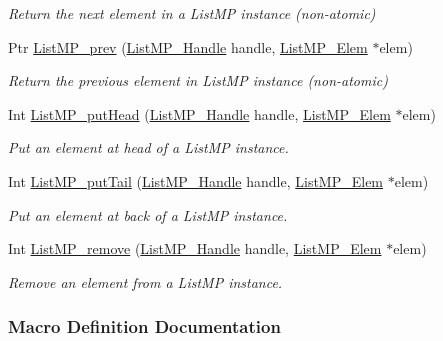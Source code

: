 \begin{DoxyCompactItemize}
\begin{DoxyCompactList}\small\item\em Return the next element in a List\-M\-P instance (non-\/atomic) \end{DoxyCompactList}\item 
Ptr \hyperlink{_list_m_p_8h_aab4e8c1ad68b0d4908ea6221b889cf14}{List\-M\-P\-\_\-prev} (\hyperlink{_list_m_p_8h_abf5a0381ce9dab133382015abaf7fe6b}{List\-M\-P\-\_\-\-Handle} handle, \hyperlink{struct_list_m_p___elem}{List\-M\-P\-\_\-\-Elem} $\ast$elem)
\begin{DoxyCompactList}\small\item\em Return the previous element in List\-M\-P instance (non-\/atomic) \end{DoxyCompactList}\item 
Int \hyperlink{_list_m_p_8h_aed19b5eadd7b9007c948c1343934e251}{List\-M\-P\-\_\-put\-Head} (\hyperlink{_list_m_p_8h_abf5a0381ce9dab133382015abaf7fe6b}{List\-M\-P\-\_\-\-Handle} handle, \hyperlink{struct_list_m_p___elem}{List\-M\-P\-\_\-\-Elem} $\ast$elem)
\begin{DoxyCompactList}\small\item\em Put an element at head of a List\-M\-P instance. \end{DoxyCompactList}\item 
Int \hyperlink{_list_m_p_8h_ab97d069db0de6f8116acb262989b8441}{List\-M\-P\-\_\-put\-Tail} (\hyperlink{_list_m_p_8h_abf5a0381ce9dab133382015abaf7fe6b}{List\-M\-P\-\_\-\-Handle} handle, \hyperlink{struct_list_m_p___elem}{List\-M\-P\-\_\-\-Elem} $\ast$elem)
\begin{DoxyCompactList}\small\item\em Put an element at back of a List\-M\-P instance. \end{DoxyCompactList}\item 
Int \hyperlink{_list_m_p_8h_ab66a123f8234c4eb218fa81407c06c3c}{List\-M\-P\-\_\-remove} (\hyperlink{_list_m_p_8h_abf5a0381ce9dab133382015abaf7fe6b}{List\-M\-P\-\_\-\-Handle} handle, \hyperlink{struct_list_m_p___elem}{List\-M\-P\-\_\-\-Elem} $\ast$elem)
\begin{DoxyCompactList}\small\item\em Remove an element from a List\-M\-P instance. \end{DoxyCompactList}\end{DoxyCompactItemize}


\subsubsection{Macro Definition Documentation}
